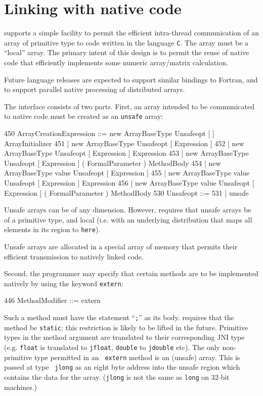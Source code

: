 \section{Linking with native code}\label{extern}
\XtenCurrVer{} supports a simple facility to permit the efficient
intra-thread communication of an array of primitive type to code
written in the language {\tt C}.  The array must be a ``local''
array. The primary intent of this design is to permit the reuse of
native code that efficiently implements some numeric array/matrix
calculation.

Future language releases are expected to support similar bindings to
{\sc Fortran}, and to support parallel native processing of
distributed \Xten{} arrays. 

The interface consists of two parts. First, an array intended to be
communicated to native code must be created as an {\tt unsafe} array:
\begin{x10}
450 ArrayCreationExpression ::= 
      new ArrayBaseType Unsafeopt [ ] 
        ArrayInitializer
451   | new ArrayBaseType Unsafeopt [ Expression ]
452   | new ArrayBaseType Unsafeopt 
          [ Expression ] Expression
453   | new ArrayBaseType Unsafeopt [ Expression ] 
          ( FormalParameter ) MethodBody
454   | new ArrayBaseType value 
           Unsafeopt [ Expression ]
455   | new ArrayBaseType value 
           Unsafeopt [ Expression ] Expression
456   | new ArrayBaseType value 
        Unsafeopt [ Expression ] 
          ( FormalParameter ) MethodBody
530   Unsafeopt ::=
531     | unsafe
\end{x10}
Unsafe arrays can be of any dimension. However, \XtenCurrVer{}
requires that unsafe arrays be of a primitive type, and local (i.e.{}
with an underlying distribution that maps all elements in its region
to {\tt here}).

Unsafe arrays are allocated in a special array of memory that permits
their efficient transmission to natively linked code.

Second, the \Xten{} programmer may specify that certain methods are to
be implemented natively by using the keyword {\tt extern}:
\begin{x10}
446   MethodModifier ::= extern
\end{x10}
Such a method must have the statement ``{\tt ;}'' as its body.
\XtenCurrVer{} requires that the method be {\tt static}; this
restriction is likely to be lifted in the future.  Primitive types in
the method argument are translated to their corresponding JNI type
(e.g.{} {\tt float} is translated to {\tt jfloat}, {\tt double} to
{\tt jdouble} etc).  The only non-primitive type permitted in an {\tt
extern} method is an (unsafe) array. This is passed at type {\tt
jlong} as an eight byte address into the unsafe region which contains
the data for the array. ({\tt jlong} is not the same as {\tt long} on
32-bit machines.)


